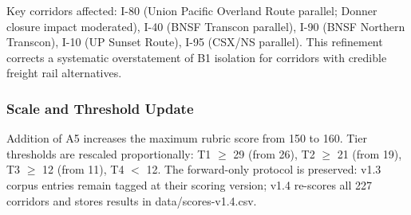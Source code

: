 Key corridors affected: I-80 (Union Pacific Overland Route parallel; Donner closure impact moderated), I-40 (BNSF Transcon parallel), I-90 (BNSF Northern Transcon), I-10 (UP Sunset Route), I-95 (CSX/NS parallel). This refinement corrects a systematic overstatement of B1 isolation for corridors with credible freight rail alternatives.

\subsubsection*{Scale and Threshold Update}

Addition of A5 increases the maximum rubric score from 150 to 160. Tier thresholds are rescaled proportionally: T1 $\geq$ 29 (from 26), T2 $\geq$ 21 (from 19), T3 $\geq$ 12 (from 11), T4 $<$ 12. The forward-only protocol is preserved: v1.3 corpus entries remain tagged at their scoring version; v1.4 re-scores all 227 corridors and stores results in data/scores-v1.4.csv.
